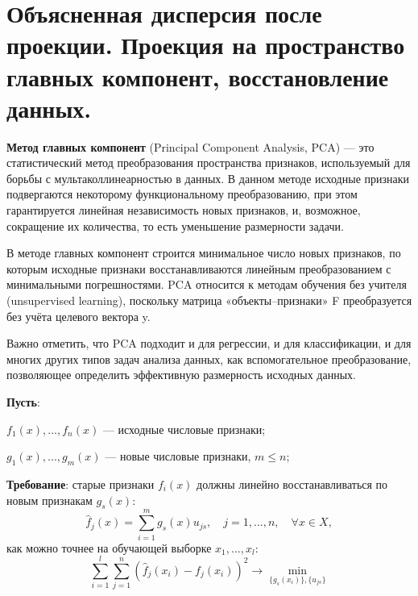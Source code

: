 \section{Объясненная дисперсия после проекции. Проекция на пространство главных компонент, восстановление данных.}

\textbf{Метод главных компонент} (Principal Component Analysis, PCA) — это статистический метод преобразования пространства признаков, используемый для борьбы с мультаколлинеарностью в данных. В данном методе исходные признаки подвергаются некоторому функциональному преобразованию, при этом гарантируется линейная независимость новых признаков, и, возможное, сокращение их количества, то есть уменьшение размерности задачи.

В методе главных компонент строится минимальное число новых признаков, по которым исходные признаки восстанавливаются линейным преобразованием с минимальными погрешностями. PCA относится к методам обучения без учителя (unsupervised learning), поскольку матрица «объекты–признаки» F преобразуется без учёта целевого вектора y.

Важно отметить, что PCA подходит и для регрессии, и для классификации, и для многих других типов задач анализа данных, как вспомогательное преобразование, позволяющее определить эффективную размерность исходных данных.

\textbf{Пусть}:

$f_1(x), ..., f_n(x)$ — исходные числовые признаки;

$g_1(x), ..., g_m(x)$ — новые числовые признаки, $m \leq n$;

\textbf{Требование}: старые признаки $f_i(x)$ должны линейно восстанавливаться по новым признакам $g_s(x)$:
\begin{equation}
    \hat{f}_j(x) = \sum_{i=1}^{m}g_s(x)u_{js}, \quad j = 1, ..., n, \quad \forall x \in X,
\end{equation}
как можно точнее на обучающей выборке $x_1, ..., x_l$:
\begin{equation}
    \sum_{i=1}^{l}\sum_{j=1}^{n}(\hat{f}_j(x_i) - f_j(x_i))^{2} \rightarrow \underset{\{g_s(x_i)\}, \{u_{js}\}}{\min}
\end{equation}

